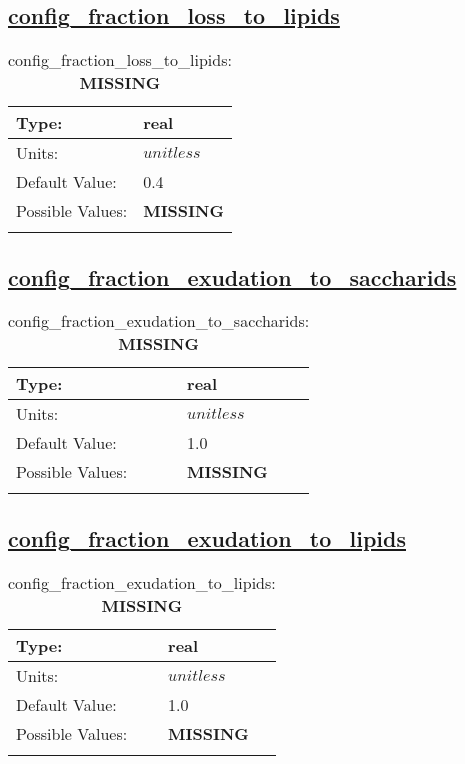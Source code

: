 \subsection[config\_fraction\_loss\_to\_lipids]{\hyperref[sec:nm_tab_biogeochemistry]{config\_fraction\_loss\_to\_lipids}}
\label{subsec:nm_sec_config_fraction_loss_to_lipids}
\begin{center}
\begin{longtable}{| p{2.0in} || p{4.0in} |}
    \hline
    Type: & real \\
    \hline
    Units: & $unitless$ \\
    \hline
    Default Value: & 0.4 \\
    \hline
    Possible Values: & {\bf \color{red} MISSING} \\
    \hline
    \caption{config\_fraction\_loss\_to\_lipids: {\bf \color{red} MISSING}}
\end{longtable}
\end{center}
\subsection[config\_fraction\_exudation\_to\_saccharids]{\hyperref[sec:nm_tab_biogeochemistry]{config\_fraction\_exudation\_to\_saccharids}}
\label{subsec:nm_sec_config_fraction_exudation_to_saccharids}
\begin{center}
\begin{longtable}{| p{2.0in} || p{4.0in} |}
    \hline
    Type: & real \\
    \hline
    Units: & $unitless$ \\
    \hline
    Default Value: & 1.0 \\
    \hline
    Possible Values: & {\bf \color{red} MISSING} \\
    \hline
    \caption{config\_fraction\_exudation\_to\_saccharids: {\bf \color{red} MISSING}}
\end{longtable}
\end{center}
\subsection[config\_fraction\_exudation\_to\_lipids]{\hyperref[sec:nm_tab_biogeochemistry]{config\_fraction\_exudation\_to\_lipids}}
\label{subsec:nm_sec_config_fraction_exudation_to_lipids}
\begin{center}
\begin{longtable}{| p{2.0in} || p{4.0in} |}
    \hline
    Type: & real \\
    \hline
    Units: & $unitless$ \\
    \hline
    Default Value: & 1.0 \\
    \hline
    Possible Values: & {\bf \color{red} MISSING} \\
    \hline
    \caption{config\_fraction\_exudation\_to\_lipids: {\bf \color{red} MISSING}}
\end{longtable}
\end{center}
